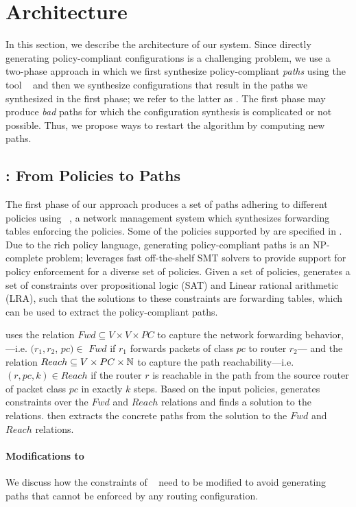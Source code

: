 \section{Architecture} \label{sec:architecture}
In this section, we describe the architecture of our system.  Since
directly generating policy-compliant configurations is a challenging
problem, we use a two-phase approach in which we first synthesize
policy-compliant \emph{paths} using the tool \genesis~\cite{genesis}
and then we synthesize configurations that result in the paths we
synthesized in the first phase; we refer to the latter as \name.
The first phase may produce \emph{bad} paths for which the
configuration synthesis is complicated or not possible. Thus, we
propose ways to restart the algorithm by computing new paths.

\subsection{\genesis: From Policies to Paths} \label{sec:genesis}
The first phase of our approach produces a set of paths adhering to
different policies using \genesis~\cite{genesis}, a network management
system which synthesizes forwarding tables enforcing the policies. 
Some of the policies supported by \genesis are specified in 
. 
Due to the rich policy language, generating policy-compliant paths is an NP-complete problem;
\genesis leverages fast off-the-shelf SMT solvers to provide
support for policy enforcement for a diverse set of policies.
Given a set of policies, \genesis generates a set of constraints 
over propositional logic (SAT) and Linear rational arithmetic (LRA),
such that the solutions to these constraints are forwarding
tables, which can be used to extract the 
policy-compliant paths.

\genesis uses the relation $Fwd \subseteq V \times V \times PC $  
to capture 
the network forwarding behavior,---i.e. 
$(r_1, r_2$, $pc)\in$ $Fwd$ if 
$r_1$ forwards packets of class $pc$ to router $r_2$---
and 
the relation $Reach \subseteq V \times PC \times \mathbb{N}$ 
to capture
the path reachability---i.e. $(r, pc, k)\in Reach$ if 
the router $r$ is reachable in the path from the source
router of packet class $pc$ in exactly $k$ steps. Based on
the input policies, \genesis generates constraints over the $Fwd$
and $Reach$ relations and finds a solution to the relations. 
\genesis then extracts the concrete paths from the solution to the $Fwd$ and $Reach$
relations.

\paragraph{Modifications to \genesis}
We  discuss how the
constraints of \genesis~\cite{genesis}
need to be modified to avoid generating paths that 
cannot be enforced by any routing configuration.

